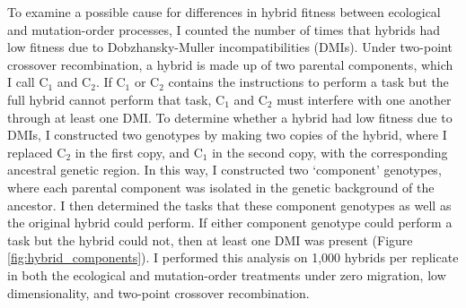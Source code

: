 \begin{doublespace}
To examine a possible cause for differences
in hybrid fitness between ecological and mutation-order processes,
I counted the number of times that hybrids had low fitness
due to Dob\-zhan\-sky-Mul\-ler incompatibilities (DMIs).
%
Under two-point crossover recombination,
a hybrid is made up of two parental components,
which I call C$_{1}$ and C$_{2}$.
%
If C$_{1}$ or C$_{2}$ contains the instructions to perform a task
but the full hybrid cannot perform that task,
C$_{1}$ and C$_{2}$ must interfere with one another through at least one DMI.
%
To determine whether a hybrid had low fitness due to DMIs,
I constructed two genotypes by making two copies of the hybrid,
where I replaced C$_{2}$ in the first copy, and C$_{1}$ in the second copy,
with the corresponding ancestral genetic region.
%
In this way, I constructed two `component' genotypes,
where each parental component was isolated
in the genetic background of the ancestor.
%
I then determined the tasks that these component genotypes
as well as the original hybrid could perform.
%
If either component genotype could perform a task
but the hybrid could not, then at least one DMI was present
(Figure \ref{fig:hybrid_components}).
%
I performed this analysis on 1,000 hybrids per replicate
in both the ecological and mutation-order treatments
under zero migration, low dimensionality, and two-point crossover recombination.




\end{doublespace}
